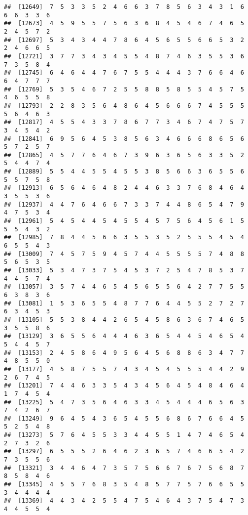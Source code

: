 \documentclass[
]{book}
\begin{document}
\begin{verbatim}
##  [12649]  7  5  3  3  5  2  4  6  6  3  7  8  5  6  3  4  3  1  6  6  6  3  3  6
##  [12673]  4  5  9  5  5  7  5  6  3  6  8  4  5  4  6  7  4  6  5  2  4  5  7  2
##  [12697]  5  3  4  3  4  4  7  8  6  4  5  6  5  5  6  6  5  3  2  2  4  6  6  5
##  [12721]  3  7  7  3  4  3  4  5  5  4  8  7  4  6  3  5  5  3  6  7  3  5  8  4
##  [12745]  6  4  6  4  4  7  6  7  5  5  4  4  4  3  7  6  6  4  6  6  4  7  7  7
##  [12769]  5  3  5  4  6  7  2  5  5  8  8  5  8  5  5  4  5  7  5  4  6  5  5  8
##  [12793]  2  2  8  3  5  6  4  8  6  4  5  6  6  6  7  4  5  5  5  5  6  4  6  3
##  [12817]  4  5  5  4  3  3  7  8  6  7  7  3  4  6  7  4  7  5  7  3  4  5  4  2
##  [12841]  6  9  5  6  4  5  3  8  5  6  3  4  6  6  6  8  6  5  6  5  7  2  5  7
##  [12865]  4  5  7  7  6  4  6  7  3  9  6  3  6  5  6  3  3  5  2  5  4  4  7  4
##  [12889]  5  5  4  4  5  5  4  5  5  3  8  5  6  6  3  6  5  5  6  5  5  7  5  8
##  [12913]  6  5  6  4  6  4  8  2  4  4  6  3  3  7  6  8  4  6  4  3  5  5  3  6
##  [12937]  4  4  7  6  4  6  6  7  3  3  7  4  4  8  6  5  4  7  9  4  7  5  3  4
##  [12961]  5  4  5  4  4  5  4  5  5  4  5  7  5  6  4  5  6  1  5  5  5  4  3  2
##  [12985]  7  8  4  4  5  6  6  3  5  5  3  5  2  5  5  5  4  5  4  6  5  5  4  3
##  [13009]  7  4  5  7  5  9  4  5  7  4  4  5  5  5  5  7  4  8  8  5  6  5  3  5
##  [13033]  5  3  4  7  3  7  5  4  5  3  7  2  5  4  7  8  5  3  7  4  4  5  7  4
##  [13057]  3  5  7  4  4  6  5  4  5  6  5  5  6  4  2  7  7  5  5  6  3  8  3  6
##  [13081]  1  5  3  6  5  5  4  8  7  7  6  4  4  5  5  2  7  2  7  6  3  4  5  3
##  [13105]  5  5  3  8  4  4  2  6  5  4  5  8  6  3  6  7  4  6  5  3  5  5  8  6
##  [13129]  3  6  5  5  6  4  4  4  6  3  6  5  4  4  5  4  6  5  4  5  4  4  5  7
##  [13153]  2  4  5  8  6  4  9  5  6  4  5  6  8  8  6  3  4  7  7  4  8  5  5  0
##  [13177]  4  5  8  7  5  5  7  4  3  4  5  4  5  5  5  4  4  2  9  2  6  7  4  5
##  [13201]  7  4  4  6  3  3  5  4  3  4  5  6  4  5  4  8  4  6  4  1  7  4  5  4
##  [13225]  5  4  7  3  5  6  4  6  3  3  4  5  4  4  4  6  5  6  3  7  4  2  6  7
##  [13249]  9  6  4  5  4  3  6  5  4  5  5  6  8  6  7  6  6  4  5  5  2  5  4  8
##  [13273]  5  7  6  4  5  5  3  3  4  4  5  5  1  4  7  4  6  5  4  2  7  3  2  6
##  [13297]  6  5  5  5  2  6  4  6  2  3  6  5  7  4  6  6  5  4  2  7  3  5  5  6
##  [13321]  3  4  4  6  4  7  3  5  7  5  6  6  7  6  7  5  6  8  7  8  5  8  4  6
##  [13345]  4  5  5  7  6  8  3  5  4  8  5  7  7  5  7  6  6  5  5  3  4  4  4  4
##  [13369]  4  4  3  4  2  5  5  4  7  5  4  6  4  3  7  5  4  7  3  4  4  5  5  4

\end{verbatim}
\end{document}
